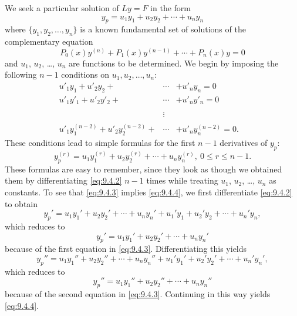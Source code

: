 We seek a particular solution of $Ly=F$ in the form
\begin{equation}
  \label{eq:9.4.2}y_{p}=u_{1}y_{1}+u_{2}y_{2}+\cdots+u_{n}y_{n}
\end{equation}
where $\{y_{1},y_{2},\dots,y_{n}\}$ is a known fundamental set of solutions of the complementary
equation
\[
  P_{0}(x)y^{(n)}+P_{1}(x)y^{(n-1)}+\cdots+P_{n}(x)y=0
\]
and $u_{1}$, $u_{2}$, \dots, $u_{n}$ are functions to be determined. We begin by imposing the
following $n-1$ conditions on $u_{1},u_{2},\dots,u_{n}$:
\begin{equation}
  \label{eq:9.4.3}
  \begin{array}{rcl}
    u'_{1}y_{1}+u'_{2}y_{2}+                        & \cdots & +u'_{n}y_{n}=0                         \\
    u'_{1}y'_{1}+u'_{2}y'_{2}+                      & \cdots & +u'_{n}y'_{n}=0                        \\
    \phantom{u'_{1}y^{(n_{1})}+u'_{2}y_{2}^{(n-1)}} & \vdots & \phantom{\cdots+u'_{n}y^{(n-1)}_{n}=q} \\
    u'_{1}y_{1}^{(n-2)}+u'_{2}y^{(n-2)}_{2}+        & \cdots & +u'_{n}y^{(n-2)}_{n} =0.
  \end{array}
\end{equation}
These conditions lead to simple formulas for the first $n-1$ derivatives of $y_{p}$:
\begin{equation}
  \label{eq:9.4.4}y^{(r)}_{p}=u_{1}y^{(r)}_{1}+u_{2}y_{2}^{(r)}+\cdots+u_{n}y^{(r)}_{n},\ 0 \le r\le n-1.
\end{equation}
These formulas are easy to remember, since they look as though we obtained them by differentiating
\eqref{eq:9.4.2} $n-1$ times while treating $u_{1}$, $u_{2}$, \dots, $u_{n}$ as constants. To see
that \eqref{eq:9.4.3} implies \eqref{eq:9.4.4}, we first differentiate \eqref{eq:9.4.2} to obtain
\[
  y_{p}'=u_{1}y_{1}'+u_{2}y_{2}'+\cdots+u_{n}y_{n}'+u_{1}'y_{1}+u_{2}'y_{2}+\cdots+u_{n}'y_{n},
\]
which reduces to
\[
  y_{p}'=u_{1}y_{1}'+u_{2}y_{2}'+\cdots+u_{n}y_{n}'
\]
because of the first equation in \eqref{eq:9.4.3}. Differentiating this yields
\[
  y_{p}''=u_{1}y_{1}''+u_{2}y_{2}''+\cdots+u_{n}y_{n}''+u_{1}'y_{1}'+u_{2}'y_{2}'+\cdots+u_{n}'y_{n}',
\]
which reduces to
\[
  y_{p}''=u_{1}y_{1}''+u_{2}y_{2}''+\cdots+u_{n}y_{n}''
\]
because of the second equation in \eqref{eq:9.4.3}. Continuing in this way yields \eqref{eq:9.4.4}.

